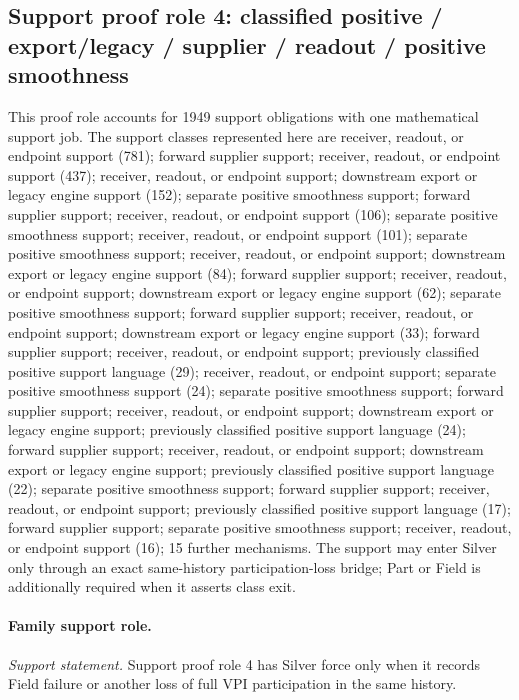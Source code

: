 \subsection{Support proof role 4: classified positive / export/legacy / supplier / readout / positive smoothness}
This proof role accounts for 1949 support obligations with one mathematical support job. The support classes represented here are receiver, readout, or endpoint support (781); forward supplier support; receiver, readout, or endpoint support (437); receiver, readout, or endpoint support; downstream export or legacy engine support (152); separate positive smoothness support; forward supplier support; receiver, readout, or endpoint support (106); separate positive smoothness support; receiver, readout, or endpoint support (101); separate positive smoothness support; receiver, readout, or endpoint support; downstream export or legacy engine support (84); forward supplier support; receiver, readout, or endpoint support; downstream export or legacy engine support (62); separate positive smoothness support; forward supplier support; receiver, readout, or endpoint support; downstream export or legacy engine support (33); forward supplier support; receiver, readout, or endpoint support; previously classified positive support language (29); receiver, readout, or endpoint support; separate positive smoothness support (24); separate positive smoothness support; forward supplier support; receiver, readout, or endpoint support; downstream export or legacy engine support; previously classified positive support language (24); forward supplier support; receiver, readout, or endpoint support; downstream export or legacy engine support; previously classified positive support language (22); separate positive smoothness support; forward supplier support; receiver, readout, or endpoint support; previously classified positive support language (17); forward supplier support; separate positive smoothness support; receiver, readout, or endpoint support (16); 15 further mechanisms. The support may enter Silver only through an exact same-history participation-loss bridge; Part or Field is additionally required when it asserts class exit.

\paragraph{Family support role.}
\emph{Support statement.} Support proof role 4 has Silver force only when it records Field failure or another loss of full VPI participation in the same history.

